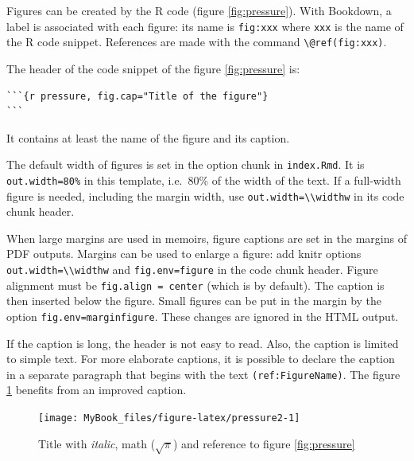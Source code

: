 \documentclass[
  12pt,
  american,
  a4paper,
  extrafontsizes,onecolumn,openright
  ]{memoir}
\newlength\widthw %
\begin{document}
\normalsize

Figures can be created by the R code (figure \ref{fig:pressure}).
With Bookdown, a label is associated with each figure: its name is \texttt{fig:xxx} where \texttt{xxx} is the name of the R code snippet.
References are made with the command \texttt{\textbackslash{}@ref(fig:xxx)}.

The header of the code snippet of the figure \ref{fig:pressure} is:

\begin{verbatim}
```{r pressure, fig.cap="Title of the figure"}
```
\end{verbatim}

It contains at least the name of the figure and its caption.

The default width of figures is set in the option chunk in \texttt{index.Rmd}.
It is \texttt{out.width=\textquotesingle{}80\%\textquotesingle{}} in this template, i.e.~80\% of the width of the text.
If a full-width figure is needed, including the margin width, use \texttt{out.width=\textquotesingle{}\textbackslash{}\textbackslash{}widthw\textquotesingle{}} in its code chunk header.

When large margins are used in memoirs, figure captions are set in the margins of PDF outputs.
Margins can be used to enlarge a figure: add knitr options \texttt{out.width=\textquotesingle{}\textbackslash{}\textbackslash{}widthw\textquotesingle{}} and \texttt{fig.env=\textquotesingle{}figure\textquotesingle{}} in the code chunk header.
Figure alignment must be \texttt{fig.align\ =\ \textquotesingle{}center\textquotesingle{}} (which is by default).
The caption is then inserted below the figure.
Small figures can be put in the margin by the option \texttt{fig.env=\textquotesingle{}marginfigure\textquotesingle{}}.
These changes are ignored in the HTML output.

If the caption is long, the header is not easy to read.
Also, the caption is limited to simple text.
For more elaborate captions, it is possible to declare the caption in a separate paragraph that begins with the text \texttt{(ref:FigureName)}.
The figure \ref{fig:pressure2} benefits from an improved caption.



\scriptsize

\begin{figure}

{\centering \texttt{[image: MyBook\_files/figure-latex/pressure2-1]} 

}

\caption{Title with \emph{italic}, math (\(\sqrt\pi\)) and reference to figure \ref{fig:pressure}}\label{fig:pressure2}
\end{figure}
\end{document}
